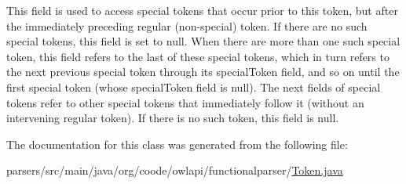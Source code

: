 This field is used to access special tokens that occur prior to this token, but after the immediately preceding regular (non-\/special) token. If there are no such special tokens, this field is set to null. When there are more than one such special token, this field refers to the last of these special tokens, which in turn refers to the next previous special token through its special\-Token field, and so on until the first special token (whose special\-Token field is null). The next fields of special tokens refer to other special tokens that immediately follow it (without an intervening regular token). If there is no such token, this field is null. 

The documentation for this class was generated from the following file\-:\begin{DoxyCompactItemize}
\item 
parsers/src/main/java/org/coode/owlapi/functionalparser/\hyperlink{org_2coode_2owlapi_2functionalparser_2_token_8java}{Token.\-java}\end{DoxyCompactItemize}
